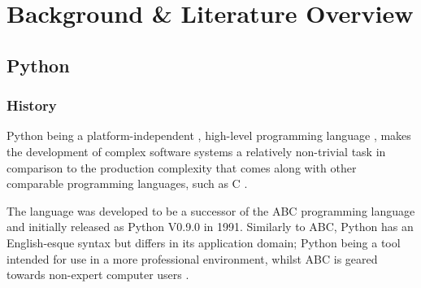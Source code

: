 \chapter{Background \& Literature Overview}

	\section{Python}
		\subsection{History}
		\par Python being a platform-independent \cite[]{srinath2017python}, high-level programming language \cite[pp.2--4]{van1995python}, makes the development of complex software systems a relatively non-trivial task
		in comparison to the production complexity that comes along with other comparable programming languages, such as C \cite[]{summerfield2007rapid}.
		\par The language was developed to be a successor of the ABC programming language \cite[]{geurts1990abc} and initially released as Python V0.9.0 in 
		1991. Similarly to ABC, Python has an English-esque syntax but differs in its application domain; Python being a tool intended for use in a more professional environment, whilst
		ABC is geared towards non-expert computer users \cite[pp.285--288]{van1991interactively}. 
		
